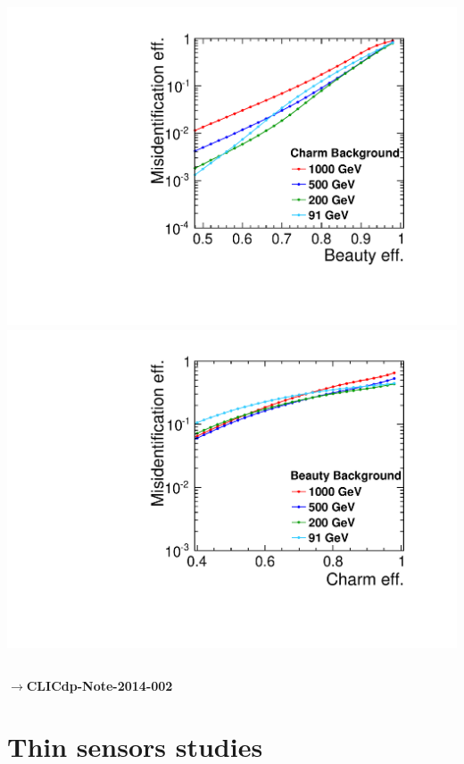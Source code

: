 \begin{frame}
  \begin{columns}
    \centering
    \includegraphics[width=\textwidth]{figures/Global_energies_CLIC_SiD_spirals_Beauty_Charm_.pdf}
    \centering
    \includegraphics[width=\textwidth]{figures/Global_energies_CLIC_SiD_spirals_Charm_Beauty_.pdf}
  \end{columns}

  \textcolor{RedViolet}{\textbf{$\rightarrow$CLICdp-Note-2014-002}}

\end{frame}


\section{Thin sensors studies}
\begin{frame}
  \frametitle{}
  \tableofcontents[currentsection]
\end{frame}

